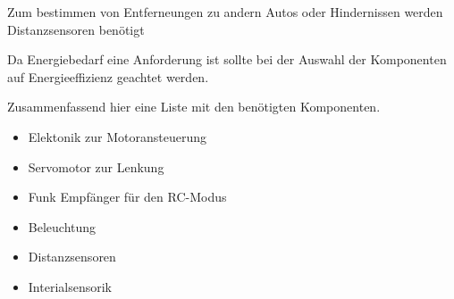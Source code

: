 Zum bestimmen von Entferneungen zu andern Autos oder Hindernissen werden Distanzsensoren benötigt

Da Energiebedarf eine Anforderung ist sollte bei der Auswahl der Komponenten auf Energieeffizienz geachtet werden.

Zusammenfassend hier eine Liste mit den benötigten Komponenten.

\begin{itemize}
 \item Elektonik zur Motoransteuerung
 \item Servomotor zur Lenkung
 \item Funk Empfänger für den RC-Modus
 \item Beleuchtung
 \item Distanzsensoren
 \item Interialsensorik
\end{itemize}







% 

